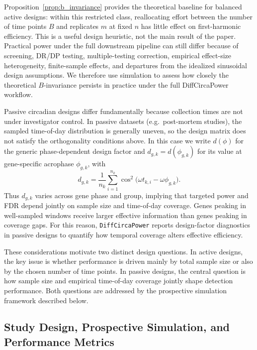 \documentclass{article}
\newcommand{\software}[1]{\texttt{#1}}
\begin{document}
Proposition~\ref{prop:b_invariance} provides the theoretical baseline for
balanced active designs: within this restricted class, reallocating effort
between the number of time points $B$ and replicates $m$ at fixed $n$ has
little effect on first-harmonic efficiency. This is a useful design heuristic,
not the main result of the paper. Practical power under the full downstream
pipeline can still differ because of screening, DR/DP testing, multiple-testing
correction, empirical effect-size heterogeneity, finite-sample effects, and
departures from the idealized sinusoidal design assumptions. We therefore use
simulation to assess how closely the theoretical $B$-invariance persists in
practice under the full DiffCircaPower workflow.

Passive circadian designs differ fundamentally because collection times are not
under investigator control. In passive datasets (e.g.\ post-mortem studies),
the sampled time-of-day distribution is generally uneven, so the design matrix
does not satisfy the orthogonality conditions above. In this case we write
$d(\phi)$ for the generic phase-dependent design factor and
$d_{g,k}=d(\phi_{g,k})$ for its value at gene-specific acrophase
$\phi_{g,k}$, with
\begin{equation}
d_{g,k}
=
\frac{1}{n_k}\sum_{i=1}^{n_k}
\cos^2\!\bigl(\omega t_{k,i}-\omega\phi_{g,k}\bigr).
\label{eq:design_factor}
\end{equation}
Thus $d_{g,k}$ varies across gene phase and group, implying that targeted power
and FDR depend jointly on sample size and time-of-day coverage. Genes peaking
in well-sampled windows receive larger effective information than genes peaking
in coverage gaps. For this reason, \software{DiffCircaPower} reports design-factor
diagnostics in passive designs to quantify how temporal coverage alters
effective efficiency.

These considerations motivate two distinct design questions. In active designs,
the key issue is whether performance is driven mainly by total sample size or
also by the chosen number of time points. In passive designs, the central
question is how sample size and empirical time-of-day coverage jointly shape
detection performance. Both questions are addressed by the prospective
simulation framework described below.



\subsection{Study Design, Prospective Simulation, and Performance Metrics}
\label{sec:study_design}
\end{document}
